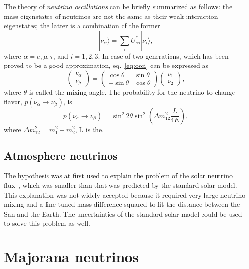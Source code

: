 The theory of \emph{neutrino oscillations} can be briefly summarized as follows: the mass eigenstates of neutrinos are not the same as their weak interaction eigenstates; the latter is a combination of the former
\begin{equation}
  \label{eq:osci}
  |\nu_{\alpha}\rangle=\sum_{i}U^{*}_{\alpha i}|\nu_{i}\rangle,
\end{equation}
where $\alpha=e,\mu,\tau$, and $i=1,2,3$. In case of two generations, which has been proved to be a good approximation, eq.~\ref{eq:osci} can be expressed as
\begin{equation}
  \label{eq:osci2}
  \left(\begin{array}{c}\nu_{\alpha}\\\nu_{\beta}\end{array}\right)=
  \left(\begin{array}{cc} \cos\theta & \sin\theta\\
      -\sin\theta & \cos\theta \end{array}\right)
  \left(\begin{array}{c}\nu_{1}\\\nu_{2}\end{array}\right),
\end{equation}
where $\theta$ is called the mixing angle. The probability for the neutrino to change flavor, $p(\nu_\alpha \rightarrow \nu_\beta)$, is
\begin{equation}
  \label{eq:pa2b}
  p(\nu_\alpha \rightarrow \nu_\beta)=
  \sin^{2}2\theta\sin^{2}\left(\Delta m^{2}_{12}\frac{L}{4E}\right),
\end{equation}
where $\Delta m^{2}_{12} =  m^{2}_{1} - m^{2}_{2}$, L is the.

\subsection{Atmosphere neutrinos}
\label{sec:atmo}
The hypothesis was at first used to explain the problem of the solar neutrino flux~\cite{Dav64,Dav68}, which was smaller than that was predicted by the standard solar model. This explanation was not widely accepted because it required very large neutrino mixing and a fine-tuned mass difference squared to fit the distance between the San and the Earth. The uncertainties of the standard solar model could be used to solve this problem as well.

\section{Majorana neutrinos}
\label{sec:major}

